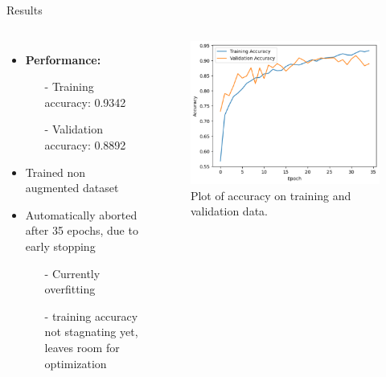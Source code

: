 \begin{frame}{\huge{Results}}
  \begin{columns}
    \begin{itemize}
      \item \textbf{Performance:}
      \begin{itemize}
        \item[-] Training accuracy: 0.9342
        \item[-] Validation accuracy: 0.8892
      \end{itemize}
      \item Trained non augmented dataset
      \item Automatically aborted after 35 epochs, due to early stopping
      \begin{itemize}
        \item[-] Currently overfitting
        \item[-] training accuracy not stagnating yet, leaves room for optimization
      \end{itemize}
    \end{itemize}
      \begin{figure}
        \centering
        \includegraphics[width=\textwidth]{content/accuracy_plot.png}
        \caption{Plot of accuracy on training and validation data.}
      \end{figure}
  \end{columns}
\end{frame}

